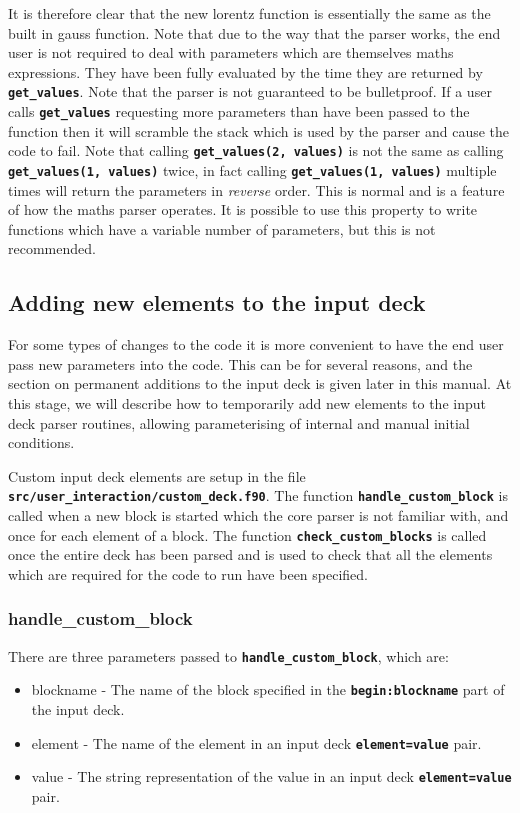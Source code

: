 \documentclass[12pt,a4paper]{article}
\newcommand{\inlinecode}[1]{{\color{warwickred} \bf\texttt{#1}}}
\begin{document}
It is therefore clear that the new lorentz function is essentially the same as
the built in gauss function. Note that due to the way that the parser works,
the end user is not required to deal with parameters which are themselves
maths expressions. They have been fully evaluated by the time they are
returned by \inlinecode{get\_values}. Note that the parser is not guaranteed to
be bulletproof. If a user calls \inlinecode{get\_values} requesting more
parameters than have been passed to the function then it will scramble the
stack which is used by the parser and cause the code to fail. Note that
calling \inlinecode{get\_values(2, values)} is not the same as calling
\inlinecode{get\_values(1, values)} twice, in fact calling
\inlinecode{get\_values(1, values)} multiple times will return the parameters in
{\it reverse} order. This is normal and is a feature of how the maths parser
operates. It is possible to use this property to write functions which have a
variable number of parameters, but this is not recommended.

\subsection{Adding new elements to the input deck}

For some types of changes to the code it is more convenient to have the end
user pass new parameters into the code. This can be for several reasons, and
the section on permanent additions to the input deck is given later in this
manual. At this stage, we will describe how to temporarily add new
elements to the input deck parser routines, allowing parameterising of
internal and manual initial conditions.

Custom input deck elements are setup in the file
\inlinecode{src/user\_interaction/custom\_deck.f90}. The function
\inlinecode{handle\_custom\_block} is called when a new block is started which
the core parser is not familiar with, and once for each element of a block. The
function \inlinecode{check\_custom\_blocks} is called once the entire deck has
been parsed and is used to check that all the elements which are required for
the code to run have been specified.

\subsubsection{handle\_custom\_block}
There are three parameters passed to \inlinecode{handle\_custom\_block}, which
are:
\begin{itemize}
\item blockname - The name of the block specified in the
  \inlinecode{begin:blockname} part of the input deck.
\item element - The name of the element in an input deck
  \inlinecode{element=value} pair.
\item value - The string representation of the value in an input deck
  \inlinecode{element=value} pair.
\end{itemize}
\end{document}
